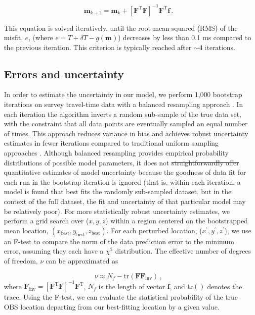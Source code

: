 \documentclass[10pt,titlepage]{article}
\providecommand{\DIFaddtex}[1]{{\protect\color{blue}\uwave{#1}}} %
\providecommand{\DIFdeltex}[1]{{\protect\color{red}\sout{#1}}}                      %
\providecommand{\DIFaddbegin}{} %
\providecommand{\DIFaddend}{} %
\providecommand{\DIFdelbegin}{} %
\providecommand{\DIFdelend}{} %
\providecommand{\DIFadd}[1]{\texorpdfstring{\DIFaddtex{#1}}{#1}} %
\providecommand{\DIFdel}[1]{\texorpdfstring{\DIFdeltex{#1}}{}} %
\begin{document}
\begin{equation}
	\mathbf{m}_{k+1} = \mathbf{m}_k + \left[ \mathbf{F}^{\text{T}} \mathbf{F} \right]^{-1} \mathbf{F}^{\text{T}} \mathbf{f} \,. \label{eq:inverse}
\end{equation}

This equation is solved iteratively, until the root-mean-squared (RMS) of the misfit, $e$, (where $e = T+\delta T-g(\mathbf{m})$) decreases by less than 0.1 ms compared to the previous iteration. This criterion is typically reached after $\sim$4 iterations. 

\subsection{Errors and uncertainty}
In order to estimate the uncertainty in our model, we perform 1,000 bootstrap iterations on survey travel-time data with a balanced resampling approach \citep{Davison1986}. In each iteration the algorithm inverts a random sub-sample of the true data set, with the constraint that all data points are eventually sampled an equal number of times. This approach reduces variance in bias and achieves robust uncertainty estimates in fewer iterations compared to traditional uniform sampling approaches \citep{Hung2011}. Although balanced resampling provides empirical probability distributions of possible model parameters, it does not \DIFdelbegin \DIFdel{straightforwardly offer }\DIFdelend \DIFaddbegin \DIFadd{offer straightforward }\DIFaddend quantitative estimates of model uncertainty because the goodness of data fit for each run in the bootstrap iteration is ignored (that is, within each iteration, a model is found that best fits the randomly sub-sampled dataset, but in the context of the full dataset, the fit and uncertainty of that particular model may be relatively poor). For more statistically robust uncertainty estimates, we perform a grid search over ($x,y,z$) within a region centered on the bootstrapped mean location, 
$(x_{{\text{best}}},y_{{\text{best}}},z_{{\text{best}}})$. For each perturbed location, ($x^{\prime},y^{\prime},z^{\prime}$), we use an F-test to compare the norm of the data prediction error to the minimum error, assuming they each have a $\chi^2$ distribution. The effective number of degrees of freedom, $\nu$ can be approximated as 

\begin{equation}
\nu \approx N_f - \text{tr}(\mathbf{F}\mathbf{F}_{\text{inv}}) \,,
\end{equation}
where $\mathbf{F}_{\text{inv}}= \left[ \mathbf{F}^{\text{T}} \mathbf{F} \right]^{-1} \mathbf{F}^{\text{T}}$, $N_f$ is the length of vector $\mathbf{f}$, and $\text{tr}()$ denotes the trace. Using the F-test, we can evaluate the statistical probability of the true OBS location departing from our best-fitting location by a given value. 
\end{document}
